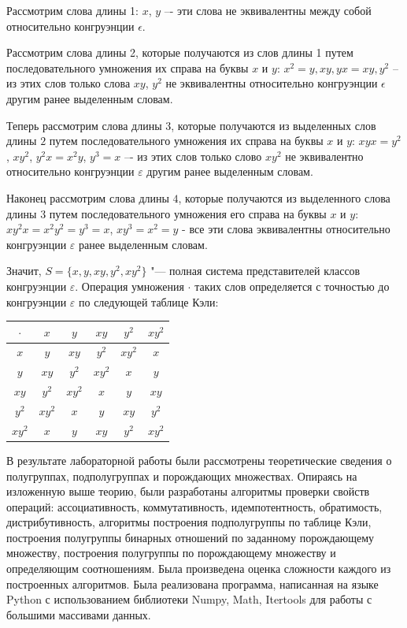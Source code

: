 \documentclass[bachelor, och, labwork]{shiza}
\begin{document}
    Рассмотрим слова длины 1: $x$, $y$ –- эти слова не эквивалентны между собой относительно конгруэнции $\epsilon$.

    Рассмотрим слова длины 2, которые получаются из слов
    длины 1 путем последовательного умножения их справа на буквы $x$ и $y$: $x^2 = y, xy, yx = xy, y^2$ -- из этих 
    слов только слова $xy$, $y^2$ не эквивалентны относительно конгруэнции $\epsilon$ другим ранее выделенным словам.

    Теперь рассмотрим слова длины $3$, которые получаются из выделенных слов длины $2$ путем последовательного
    умножения их справа на буквы $x$ и $y$: $xyx = y^2$, $xy^2$,  $y^2x = x^2y$, $y^3 = x$ –- из этих слов только
    слово $xy^2$ не эквивалентно относительно конгруэнции $\varepsilon$ другим ранее выделенным словам.

    Наконец рассмотрим слова длины $4$, которые получаются из выделенного слова длины $3$ путем последовательного
    умножения его справа на буквы $x$ и $y$: $xy^2x = x^2y^2 = y^3 = x$, $xy^3 = x^2 = y$ - все эти слова эквивалентны
    относительно конгруэнции $\varepsilon$ ранее выделенным словам.

        Значит, $S = \{x, y, xy, y^2, xy^2 \}$ "--- полная система представителей классов конгруэнции $\varepsilon$.
        Операция умножения $\cdot$ таких слов определяется с точностью до конгруэнции $\varepsilon$ по следующей таблице
        Кэли:

     \begin{table}[H]
          \centering
          \begin{tabular}{|c|c|c|c|c|c|}
          \hline
          $\cdot $ & $x$ & $y$  & $xy$  & $y^2$ & $xy^2$ \\ \hline
          $x$      & $y$ & $xy$ & $y^2$  & $xy^2$ & $x$ \\ \hline
          $y$      & $xy$ & $y^2$ & $xy^2$ & $x$ & $y$ \\ \hline
          $xy$     & $y^2$ & $xy^2$ & $x$ & $y$ & $xy$ \\ \hline
          $y^2$    & $xy^2$ & $x$ & $y$ & $xy$ & $y^2$ \\ \hline
          $xy^2$   & $x$ &  $y$  &  $xy$ & $y^2$ & $xy^2$ \\ \hline
          \end{tabular}
        \end{table}
    \conclusion
    
    В результате лабораторной работы были рассмотрены теоретические сведения о полугруппах, подполугруппах и
    порождающих множествах. Опираясь на изложенную
    выше теорию, были разработаны алгоритмы проверки свойств операций: ассоциативность, коммутативность, идемпотентность, обратимость,
    дистрибутивность, алгоритмы построения подполугруппы по таблице Кэли, построения
    полугруппы бинарных отношений по заданному порождающему множеству, построения полугруппы по порождающему множеству и
    определяющим соотношениям. Была произведена оценка сложности каждого из  построенных алгоритмов. Была реализована программа, написанная на языке Python
    с использованием библиотеки Numpy, Math, Itertools для работы с большими массивами данных.
    
\end{document}
